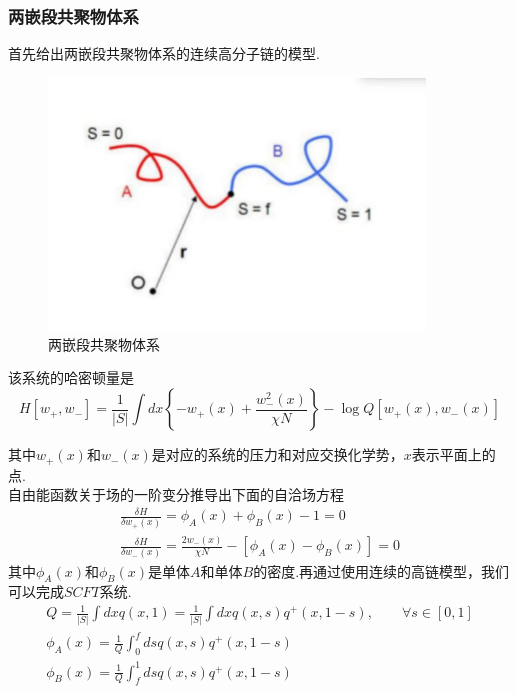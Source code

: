 \documentclass[12pt]{article}
\begin{document}
\begin{CJK}{UTF8}{gkai}
    \subsubsection{两嵌段共聚物体系}
    
      首先给出两嵌段共聚物体系的连续高分子链的模型.\\
      
    \begin{figure}[H] 
     \centering
     \includegraphics[width=10cm]{scft.jpg}
     \caption{两嵌段共聚物体系}
    \end{figure}
    
    该系统的哈密顿量是\\
    \begin{equation}
    H[w_+,w_-]=\frac{1}{|S|}\int dx\left\lbrace -w_+(x)+\frac{w_{-}^2(x)}{\chi N}\right\rbrace -\log Q[w_+(x),w_-(x)]	
    \end{equation}
    
    
    其中$w_+(x)$和$w_-(x)$是对应的系统的压力和对应交换化学势，$x$表示平面上的点.\\
    
    自由能函数关于场的一阶变分推导出下面的自洽场方程\\

  \begin{gather}
    \frac{\delta H}{\delta w_+(x)}=\phi _A(x)+\phi _B(x)-1=0 \\   
    \frac{\delta H}{\delta w_-(x)}=\frac{2w_-(x)}{\chi N}-[\phi _A(x)-\phi _B(x)]=0
   \end{gather}
   其中$\phi _A(x)$和$\phi _B(x)$是单体$A$和单体$B$的密度.再通过使用连续的高链模型，我们可以完成$SCFT$系统. 
  \begin{gather}
    Q=\frac{1}{|S|}\int dx q(x,1)=\frac{1}{|S|}\int dx q(x,s)q^{+}(x,1-s),\qquad \forall s \in[0,1]  \\
   \phi _A(x)=\frac{1}{Q}\int_0^f ds q(x,s)q^{+}(x,1-s)\\
   \phi _B(x)=\frac{1}{Q}\int_f^1 ds q(x,s)q^{+}(x,1-s)
    \end{gather}
    

\end{CJK}
\end{document}
